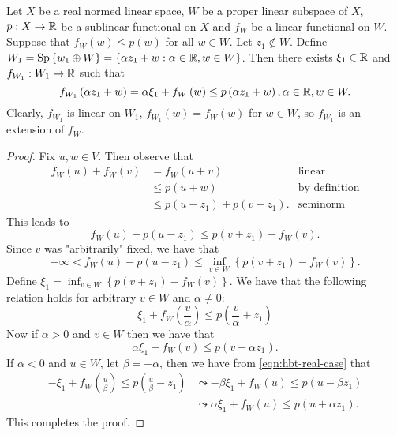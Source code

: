 \begin{lemma}
Let $X$ be a real normed linear space, $W$ be a proper linear subspace of $X$, $p : X \to \mathbb R$ be a sublinear functional on $X$ and $f_{W}$ be a linear functional on $W$. Suppose that $f_{W} (w) \le p \left( w \right)$ for all $w\in W$. Let $z_{1} \not \in W$. Define $W_{1} = \operatorname{Sp} \left\{ w_{1} \oplus W \right\} = \left\{ \alpha z_{1} + w  : \alpha \in \mathbb R, w\in W\right\}$. Then there exists $\xi_{1} \in \mathbb R$ and $f_{W_{1}}: W_{1} \to \mathbb R$ such that 
\begin{equation*}
    f_{W_{1}} \left( \alpha z_{1} + w \right) = \alpha \xi_{1} + f_{W} \left( w \right) \le p \left( \alpha z_{1} + w \right), \alpha \in \mathbb R, w\in W.
\end{equation*}
Clearly, $f_{W_{1}}$ is linear on $W_{1}$, $f_{W_{1}}(w)=f_{W}(w)$ for $w\in W$, so $f_{W_{1}}$ is an extension of $f_{W}$.
    \label{lem:hbt-baby}
\end{lemma}
\begin{proof}
    Fix $u,w \in V$. Then observe that
    \begin{align*}
	f_{W} (u) + f_{W} (v) &= f_{W} \left( u+v \right) & \text{linear}\\
	&\le p(u+w) &\text{by definition}\\
	&\le p\left( u-z_{1} \right) + p\left( v+z_{1} \right). & \text{seminorm}
    \end{align*}
    This leads to 
    \begin{equation*}
	f_{W}(u)-p\left( u-z_{1} \right) \le p\left( v+z_{1} \right) - f_{W} (v).
    \end{equation*}
    Since $v$ was "arbitrarily" fixed, we have that
    \begin{equation}
	-\infty < f_{W} \left( u \right) - p\left( u-z_{1} \right) \le \inf_{v\in W} \left\{ p\left( v+z_{1} \right) - f_{W} \left( v \right) \right\}.
	\label{eqn:hbt-real-case}
    \end{equation}
    Define $\xi_{1} = \inf_{v\in W} \left\{ p\left( v+z_{1} \right) - f_{W} \left( v \right) \right\}$.
    We have that the following relation holds for arbitrary $v \in W$ and $\alpha \ne 0$:
    \begin{equation*}
	\xi_{1} + f_{W} \left( \frac{v}{\alpha} \right) \le p\left( \frac{v}{\alpha} + z_{1} \right)
    \end{equation*}
    Now if $\alpha > 0$ and $v\in W$ then we have that 
    \begin{equation*}
	\alpha \xi_{1} + f_{W}(v) \le p(v+ \alpha z_{1}).
    \end{equation*}
    If $\alpha < 0$ and $u\in W$, let $\beta = -\alpha$, then we have from \ref{eqn:hbt-real-case} that 
    \begin{align*}
	-\xi_{1} + f_{W} \left( \frac{u}{\beta}\right) \le p \left( \frac{u}{\beta}-z_{1} \right) &\leadsto  -\beta \xi_{1} + f_{W} \left( u \right) \le p \left( u - \beta z_{1} \right) \\
	& \leadsto \alpha \xi_{1} + f_{W}\left( u \right) \le p \left( u+\alpha z_{1} \right).
    \end{align*}
    This completes the proof.
\end{proof}
